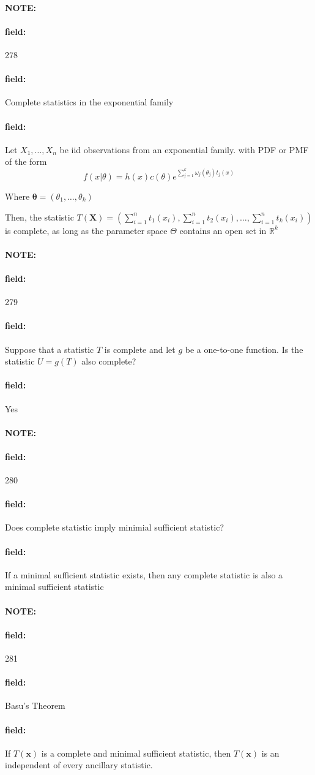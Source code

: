 \documentclass[12pt]{article}
\newenvironment{note}{\paragraph{NOTE:}}{}
\newenvironment{field}{\paragraph{field:}}{}
\begin{document}
\begin{note} \begin{field} \tiny 278 \end{field}
  \begin{field}
    Complete statistics in the exponential family
  \end{field}
  \begin{field}
    Let $X_1, \ldots , X_n$ be iid observations from an exponential family. with PDF or PMF of the form
    $$ f(x|\theta) = h(x)c(\theta)e^{\sum_{j=1}^k \omega_j(\theta_j)t_j(x)}$$

    Where $\boldsymbol\theta = (\theta_1, \ldots , \theta_k)$

    Then, the statistic $T(\mathbf{X}) = (\sum_{i=1}^n t_1(x_i), \sum _{i = 1}^n t_2(x_i), \ldots , \sum _{i = 1}^n t_k(x_i))$ is complete, as long as the parameter space $\Theta$ contains an open set in $\mathbb{R}^k$
  \end{field}
\end{note}

\begin{note} \begin{field} \tiny 279 \end{field}
  \begin{field}
    Suppose that a statistic $T$ is complete and let $g$ be a one-to-one function. Is the statistic $U = g(T)$ also complete?
  \end{field}
  \begin{field}
    Yes
  \end{field}
\end{note}

\begin{note} \begin{field} \tiny 280 \end{field}
  \begin{field}
    Does complete statistic imply minimial sufficient statistic?
  \end{field}
  \begin{field}
    If a minimal sufficient statistic exists, then any complete statistic is also a minimal sufficient statistic
  \end{field}
\end{note}

\begin{note} \begin{field} \tiny 281 \end{field}
  \begin{field}
    Basu's Theorem
  \end{field}
  \begin{field}
    If $T(\mathbf{x})$ is a complete and minimal sufficient statistic, then $T (\mathbf{x})$ is an independent of every ancillary statistic.
  \end{field}
\end{note}
\end{document}
